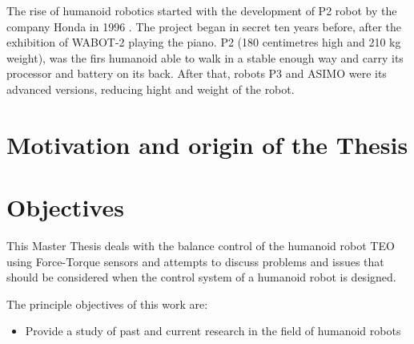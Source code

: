 The rise of humanoid robotics started with the development of P2 robot by the company Honda in 1996 \cite{Kaj2005}. The project began in secret ten years before, after the exhibition of WABOT-2 playing the piano. P2 (180 centimetres high and 210 kg weight), was the firs humanoid able to walk in a stable enough way and carry its processor and battery on its back. After that, robots P3 and ASIMO were its advanced versions, reducing hight and weight of the robot.


\section{Motivation and origin of the Thesis}

\section{Objectives}
This Master Thesis deals with the balance control of the humanoid robot TEO using Force-Torque sensors and attempts to discuss problems and issues that should be considered when the control system of a humanoid robot is designed. 

The principle objectives of this work are:
\begin{itemize}
\item Provide a study of past and current research in the field of humanoid robots
\end{itemize}



